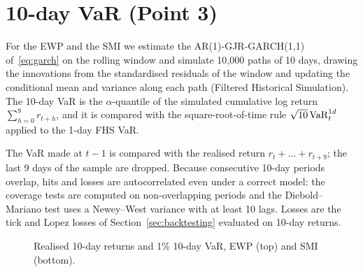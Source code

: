 \section{10-day VaR (Point 3)}\label{sec:var10}

For the EWP and the SMI we estimate the AR(1)-GJR-GARCH(1,1) of~\eqref{eq:garch} on the rolling window and simulate
10{,}000 paths of 10 days, drawing the innovations from the standardised residuals of the window and updating the
conditional mean and variance along each path (Filtered Historical Simulation). The 10-day VaR is the $\alpha$-quantile
of the simulated cumulative log return $\sum_{h=0}^{9} r_{t+h}$, and it is compared with the square-root-of-time rule
$\sqrt{10}\,\mathrm{VaR}_t^{1d}$ applied to the 1-day FHS VaR.

The VaR made at $t-1$ is compared with the realised return $r_t + \dots + r_{t+9}$; the last 9 days of the sample
are dropped. Because consecutive 10-day periods overlap, hits and losses are autocorrelated even under a correct model:
the coverage tests are computed on non-overlapping periods and the Diebold--Mariano test uses a Newey--West variance
with at least 10 lags. Losses are the tick and Lopez losses of Section~\ref{sec:backtesting} evaluated on 10-day returns.


\begin{figure}[H]\centering
{}
\caption{Realised 10-day returns and 1\% 10-day VaR, EWP (top) and SMI (bottom).}\label{fig:var10}
\end{figure}

